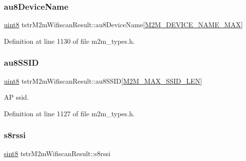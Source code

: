 \mbox{\label{structtstrM2mWifiscanResult_a7fdc1783d18cb6c57d17cc73cf0c171f}} 
\subsubsection{\texorpdfstring{au8\+Device\+Name}{au8DeviceName}}
{\footnotesize\ttfamily \hyperlink{group__DataT_ga4df709a77647e870bbf1d955b8edc9a6}{uint8} tstr\+M2m\+Wifiscan\+Result\+::au8\+Device\+Name\mbox{[}\hyperlink{group__WlanDefines_ga13694b7fb6c7afefab58c38a43aa1957}{M2\+M\+\_\+\+D\+E\+V\+I\+C\+E\+\_\+\+N\+A\+M\+E\+\_\+\+M\+AX}\mbox{]}}



Definition at line 1130 of file m2m\+\_\+types.\+h.

\mbox{\label{structtstrM2mWifiscanResult_a9636bd1e4481cde0a1523a97a394b185}} 
\subsubsection{\texorpdfstring{au8\+S\+S\+ID}{au8SSID}}
{\footnotesize\ttfamily \hyperlink{group__DataT_ga4df709a77647e870bbf1d955b8edc9a6}{uint8} tstr\+M2m\+Wifiscan\+Result\+::au8\+S\+S\+ID\mbox{[}\hyperlink{group__WlanDefines_gab2bd95c18ede2fbc07b44c5660cc0097}{M2\+M\+\_\+\+M\+A\+X\+\_\+\+S\+S\+I\+D\+\_\+\+L\+EN}\mbox{]}}

AP ssid. 

Definition at line 1127 of file m2m\+\_\+types.\+h.

\mbox{\label{structtstrM2mWifiscanResult_a34d94f696097c6c569b480fe4262a2cc}} 
\subsubsection{\texorpdfstring{s8rssi}{s8rssi}}
{\footnotesize\ttfamily \hyperlink{group__DataT_gae35f10ffd0ac8dd2bc3e794da9bdfbc7}{sint8} tstr\+M2m\+Wifiscan\+Result\+::s8rssi}

